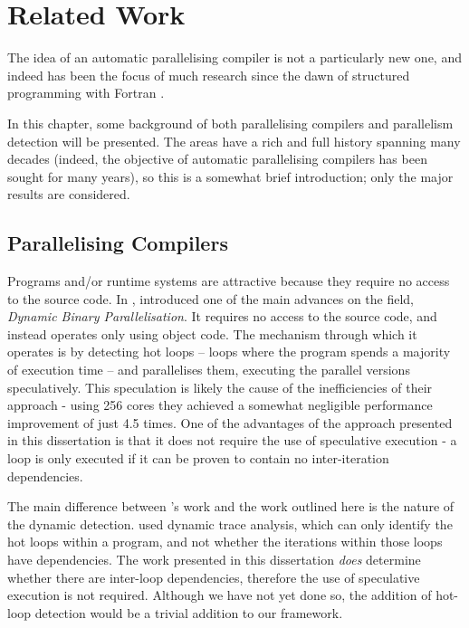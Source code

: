 \chapter{Related Work} \label{chp:related}
The idea of an automatic parallelising compiler is not a particularly new one, and indeed has been the focus of much research since the dawn of structured programming with Fortran \citep{Backus1979}.

In this chapter, some background of both parallelising compilers and parallelism detection will be presented. The areas have a rich and full history spanning many decades (indeed, the objective of automatic parallelising compilers has been sought for many years), so this is a somewhat brief introduction; only the major results are considered.

\section{Parallelising Compilers} \label{sec:related/compilers}
Programs and/or runtime systems are attractive because they require no access to the source code. In \citeyear{Yang2011}, \citet{Yang2011} introduced one of the main advances on the field, \textit{Dynamic Binary Parallelisation}. It requires no access to the source code, and instead operates only using object code. The mechanism through which it operates is by detecting hot loops -- loops where the program spends a majority of execution time -- and parallelises them, executing the parallel versions speculatively. This speculation is likely the cause of the inefficiencies of their approach - using 256 cores they achieved a somewhat negligible performance improvement of just 4.5 times. One of the advantages of the approach presented in this dissertation is that it does not require the use of speculative execution - a loop is only executed if it can be proven to contain no inter-iteration dependencies.
	
The main difference between \citeauthor{Yang2011}'s work and the work outlined here is the nature of the dynamic detection. \citeauthor{Yang2011} used dynamic trace analysis, which can only identify the hot loops within a program, and not whether the iterations within those loops have dependencies. The work presented in this dissertation \emph{does} determine whether there are inter-loop dependencies, therefore the use of speculative execution is not required. Although we have not yet done so, the addition of hot-loop detection would be a trivial addition to our framework.


